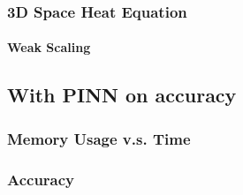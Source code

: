 \begin{frame}
  \frametitle{3D Space Heat Equation}
  \framesubtitle{Weak Scaling}

  

\end{frame}






\subsection{With PINN on accuracy}
\begin{frame}
  \frametitle{Memory Usage v.s. Time }

  

\end{frame}

\begin{frame}
  \frametitle{Accuracy}

  

\end{frame}